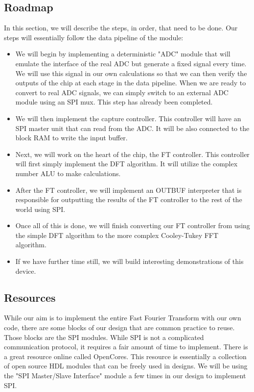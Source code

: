 \documentclass[12pt]{article}
\begin{document}
  \subsection*{Roadmap}
    In this section, we will describe the steps, in order, that need to be done. Our steps will essentially follow the data pipeline of the module:
    \begin{itemize}
      \item We will begin by implementing a deterministic "ADC" module that will emulate the interface of the real ADC but generate a fixed signal every time. We will use this signal in our own calculations so that we can then verify the outputs of the chip at each stage in the data pipeline. When we are ready to convert to real ADC signals, we can simply switch to an external ADC module using an SPI mux. This step has already been completed.
      \item We will then implement the capture controller. This controller will have an SPI master unit that can read from the ADC. It will be also connected to the block RAM to write the input buffer.
      \item Next, we will work on the heart of the chip, the FT controller. This controller will first simply implement the DFT algorithm. It will utilize the complex number ALU to make calculations.
      \item After the FT controller, we will implement an OUTBUF interpreter that is responsible for outputting the results of the FT controller to the rest of the world using SPI.
      \item Once all of this is done, we will finish converting our FT controller from using the simple DFT algorithm to the more complex Cooley-Tukey FFT algorithm.
      \item If we have further time still, we will build interesting demonstrations of this device.
    \end{itemize}
  \subsection*{Resources}
    While our aim is to implement the entire Fast Fourier Transform with our own code, there are some blocks of our design that are common practice to reuse. Those blocks are the SPI modules. While SPI is not a complicated communication protocol, it requires a fair amount of time to implement. There is a great resource online called OpenCores. This resource is essentially a collection of open source HDL modules that can be freely used in designs. We will be using the "SPI Master/Slave Interface" module a few times in our design to implement SPI.
\end{document}
